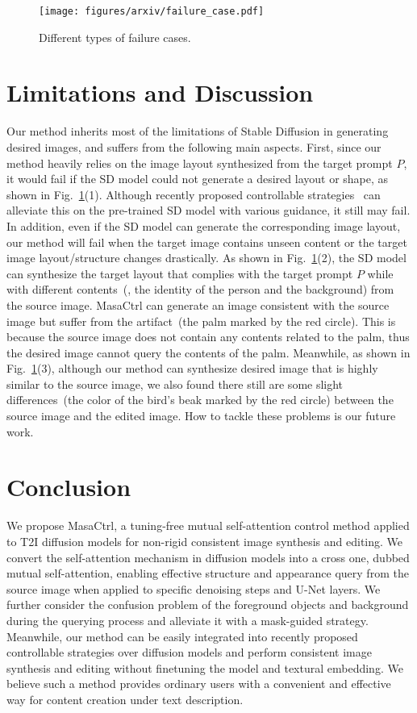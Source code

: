 \documentclass[10pt,twocolumn,letterpaper]{article}
\begin{document}
\begin{figure}[b]
    \centering
    \texttt{[image: figures/arxiv/failure\_case.pdf]}
    \caption{Different types of failure cases. }
    \label{fig:failure_case}
\end{figure}

\section{Limitations and Discussion}
Our method inherits most of the limitations of Stable Diffusion in generating desired images, and suffers from the following main aspects. First, since our method heavily relies on the image layout synthesized from the target prompt $P$, it would fail if the SD model could not generate a desired layout or shape, as shown in Fig.~\ref{fig:failure_case}(1). Although recently proposed controllable strategies~\cite{mou2023t2i, zhang2023adding} can alleviate this on the pre-trained SD model with various guidance, it still may fail. In addition, even if the SD model can generate the corresponding image layout, our method will fail when the target image contains unseen content or the target image layout/structure changes drastically. As shown in Fig.~\ref{fig:failure_case}(2), the SD model can synthesize the target layout that complies with the target prompt $P$ while with different contents~(\ie, the identity of the person and the background) from the source image. MasaCtrl can generate an image consistent with the source image but suffer from the artifact~(the palm marked by the red circle). This is because the source image does not contain any contents related to the palm, thus the desired image cannot query the contents of the palm. Meanwhile, as shown in Fig.~\ref{fig:failure_case}(3), although our method can synthesize desired image that is highly similar to the source image, we also found there still are some slight differences~(the color of the bird's beak marked by the red circle) between the source image and the edited image. How to tackle these problems is our future work. 

\section{Conclusion}
We propose MasaCtrl, a tuning-free mutual self-attention control method applied to T2I diffusion models for non-rigid consistent image synthesis and editing. We convert the self-attention mechanism in diffusion models into a cross one, dubbed mutual self-attention, enabling effective structure and appearance query from the source image when applied to specific denoising steps and U-Net layers. We further consider the confusion problem of the foreground objects and background during the querying process and alleviate it with a mask-guided strategy. Meanwhile, our method can be easily integrated into recently proposed controllable strategies over diffusion models and perform consistent image synthesis and editing without finetuning the model and textural embedding. We believe such a method provides ordinary users with a convenient and effective way for content creation under text description.


\clearpage

{\small


}
\end{document}
